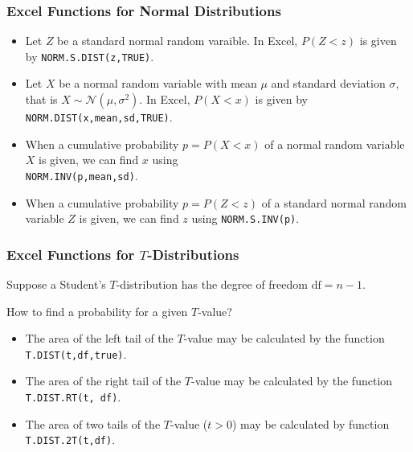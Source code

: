 \hypertarget{excel-functions-for-normal-distributions}{%
\subsubsection{Excel Functions for Normal
Distributions}\label{excel-functions-for-normal-distributions}}

\begin{itemize}
\item
  Let \(Z\) be a standard normal random varaible. In Excel, \(P(Z<z)\)
  is given by \texttt{NORM.S.DIST(z,TRUE)}.
\item
  Let \(X\) be a normal random variable with mean \(\mu\) and standard
  deviation \(\sigma\), that is \(X\sim \mathcal{N}(\mu, \sigma^2)\). In
  Excel, \(P(X<x)\) is given by \texttt{NORM.DIST(x,mean,sd,TRUE)}.
\item
  When a cumulative probability \(p=P(X<x)\) of a normal random variable
  \(X\) is given, we can find \(x\) using\\ \texttt{NORM.INV(p,mean,sd)}.
\item
  When a cumulative probability \(p=P(Z<z)\) of a standard normal random
  variable \(Z\) is given, we can find \(z\) using
  \texttt{NORM.S.INV(p)}.
\end{itemize}

\hypertarget{excel-functions-for-t-distributions}{%
\subsubsection{\texorpdfstring{Excel Functions for
\(T\)-Distributions}{Excel Functions for T-Distributions}}\label{excel-functions-for-t-distributions}}

Suppose a Student's \(T\)-distribution has the degree of freedom
\(\text{df}=n-1\).

How to find a probability for a given \(T\)-value?

\begin{itemize}
  \item
    The area of the left tail of the \(T\)-value may be calculated by
    the function \texttt{T.DIST(t,df,true)}.
  \item
    The area of the right tail of the \(T\)-value may be calculated by
    the function \texttt{T.DIST.RT(t,\ df)}.
  \item
    The area of two tails of the \(T\)-value
    (\(t > 0\)) may be calculated by
    function \texttt{T.DIST.2T(t,df)}.
  \end{itemize}
  
